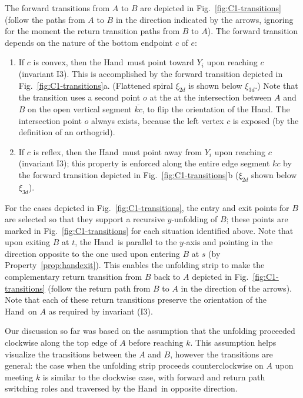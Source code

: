 \documentclass[11pt]{article}
\newcommand\hand{{\sc Hand}}
\begin{document}
The forward transitions from $A$ to $B$ are depicted in Fig.~\ref{fig:C1-transitions} (follow the paths from $A$ to $B$ in the direction indicated by the arrows, ignoring for the moment the return transition paths from $B$ to $A$). The forward transition depends on the nature of the bottom endpoint $c$ of $e$:
\begin{enumerate}
\item If $c$ is convex, then  the \hand\ must point toward $Y_i$ upon reaching $c$ (invariant I3). This is accomplished by the forward transition depicted in Fig.~\ref{fig:C1-transitions}a. (Flattened spiral $\xi_{2d}$ is shown below $\xi_{3d}$.) Note that the transition uses a second point $o$ at the at the intersection between $A$ and $B$ on the open vertical segment $\overline{kc}$, to flip the orientation of the \hand. The intersection point $o$ always exists, because the left vertex $c$ is exposed (by the definition of an orthogrid). 
\item If $c$ is reflex, then the \hand\ must point away from $Y_i$ upon reaching $c$ (invariant I3); this property is enforced along the entire edge segment $kc$ by the forward transition depicted in Fig.~\ref{fig:C1-transitions}b ($\xi_{2d}$ shown below $\xi_{3d}$).
\end{enumerate}
For the cases depicted in Fig.~\ref{fig:C1-transitions}, 
the entry and exit points for $B$ are selected so that they support a recursive $y$-unfolding of $B$; these points are marked in Fig.~\ref{fig:C1-transitions} for each situation identified above. Note that upon exiting $B$ at $t$,  the \hand\ is parallel to the $y$-axis and pointing in the direction opposite to the one used upon entering $B$ at $s$ (by Property~\ref{prop:handexit}). This enables the unfolding strip to make the complementary return transition from $B$ back to $A$ depicted in Fig.~\ref{fig:C1-transitions} (follow the return path from $B$ to $A$ in the direction of the arrows). Note that each of these return transitions preserve the orientation of the \hand\  on $A$ as required by invariant (I3). 

Our discussion so far was based on the assumption that the unfolding proceeded clockwise along the top edge of $A$ before reaching $k$. This assumption helps visualize the transitions between the $A$ and $B$, however the transitions are general: the case when the unfolding strip proceeds counterclockwise on $A$ upon meeting $k$ is similar to the clockwise case, with forward and return path switching roles and traversed by the \hand\ in opposite direction. 
\end{document}
